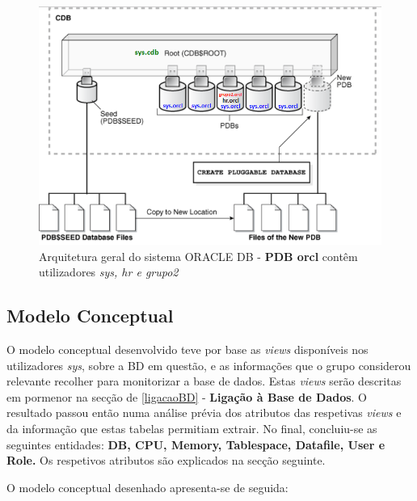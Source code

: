 \documentclass[a4paper]{article}
\begin{document}
\begin{figure}[H]
\centering
\includegraphics[scale=0.8]{arquitetura.png}
\caption{Arquitetura geral do sistema ORACLE DB - \textbf{ PDB orcl} contêm utilizadores \emph{sys, hr e grupo2}}
\end{figure}

\newpage
\subsection{Modelo Conceptual}
\hspace{3mm} 
O modelo conceptual desenvolvido teve por base as \emph{views} disponíveis nos utilizadores \emph{sys}, sobre a BD em questão, e as informações que o grupo considerou relevante recolher para monitorizar a base de dados. Estas \emph{views} serão descritas em pormenor na secção de \ref{ligacaoBD} - \textbf{Ligação à Base de Dados}. O resultado passou então numa análise prévia dos atributos das respetivas \emph{views} e da informação que estas tabelas permitiam extrair. No final, concluiu-se as seguintes entidades:
\textbf{DB, CPU, Memory, Tablespace, Datafile, User e Role.} Os respetivos atributos são explicados na secção seguinte.

O modelo conceptual desenhado apresenta-se de seguida:
\end{document}
